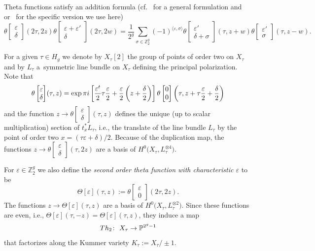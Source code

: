 \documentclass[11pt]{article}
\numberwithin{equation}{section}
\numberwithin{equation}{section}
\newcommand{\de}{\delta}
\newcommand{\ep}{\varepsilon}
\newcommand{\PP}{{\mathbb{P}}}
\newcommand{\ZZ}{{\mathbb{Z}}}
\def\ZZ{{\mathbb Z}}
\def\t{\theta}
\def\s{\sigma}
\def\T{\Theta}
\def\tt#1#2{{\t\left[\begin{matrix}{#1}\\ {#2}\end{matrix}\right]}}
\begin{document}
Theta functions satisfy an addition formula (cf.~\cite{Ig72} for a general formulation and~\cite{Gr} or~\cite{GSM} for the specific version we use here)
\[
\theta \begin{bmatrix} \ep \\ \de \end{bmatrix} (2\tau, 2z) \theta \begin{bmatrix} \ep + \ep' \\ \de \end{bmatrix} (2\tau, 2w)= \frac{1}{2^g} \sum_{\s \in \ZZ_2^{g}}(-1)^{\langle \ep , \s\rangle} \theta \begin{bmatrix} \ep '\\ \de +\s \end{bmatrix} (\tau, z+w) \theta \begin{bmatrix} \ep'\\ \s \end{bmatrix} (\tau,z-w).
\]

For a given $\tau \in H_g$ we denote by $X_{\tau}[2]$ the group of points of order two on $X_{\tau}$ and by $L_{\tau}$ a~symmetric line bundle on $X_\tau$ defining the principal polarization. Note that
\[
\tt\ep\de(\tau,z)=\exp \pi {\rm i} \left[\frac{\ep^t}{2}\tau\frac{\ep}{2} +\frac{\ep}{2}\left(z+\frac{\de}{2}\right) \right]\tt{0}{0}\left( \tau,z+ \tau\frac{\ep}{2} +\frac{\de}{2} \right)
\]
and the function $z \to
\theta\left[\begin{smallmatrix}\ep \\ \de \end{smallmatrix}\right] (\tau,z)$ defines the unique (up to scalar multiplication)
section of $t_x^*L_{\tau}$, i.e., the translate of the line bundle $L_{\tau}$ by the point of order two $x=(\tau \ep +\de)/2$. Because of the duplication map, the functions $z \rightarrow
\theta\left[\begin{smallmatrix}\ep \\ \de \end{smallmatrix}\right] (\tau,2z)$ are a basis of $H^0\big(X_\tau, L_{\tau}^{\otimes 4}\big)$.

For $\ep\in\ZZ_2^g$ we also
define the {\it second order theta function with characteristic $\ep$} to
be
\[
\T[\ep](\tau,z):=\tt{\ep}{0}(2\tau,2z).
\]
The functions $z \rightarrow \T[\ep](\tau,z)$ are a basis of $H^0\big(X_\tau, L_{\tau}^{\otimes 2}\big)$. Since these functions are even, i.e., $
\T[\ep](\tau,-z)=
\T[\ep](\tau,z)$, they induce a map
\[
{\rm Th}_2\colon \ X_\tau\to \PP^{2^g-1}
\]
 that factorizes along the Kummer variety $ K_{\tau}:=X_\tau/\pm 1$.
\end{document}
